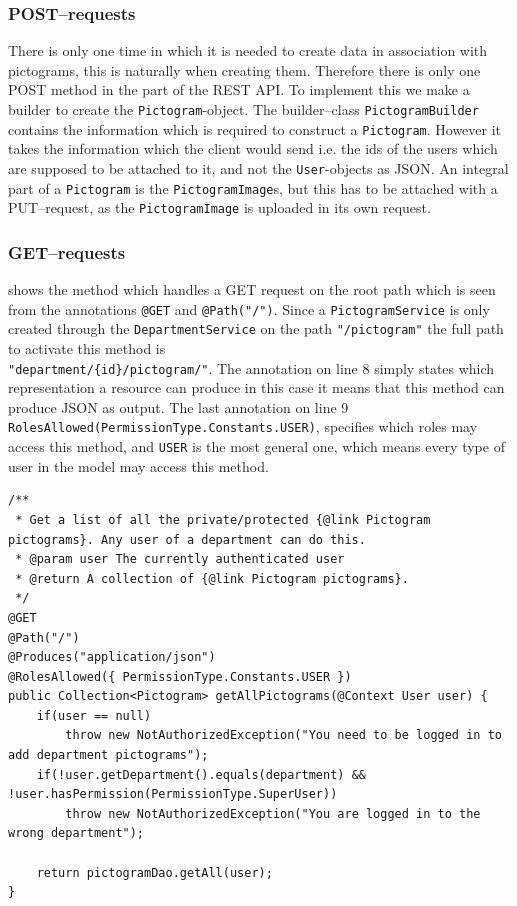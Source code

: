 \subsubsection*{POST--requests}
There is only one time in which it is needed to create data in association with pictograms, this is naturally when creating them.
Therefore there is only one POST method in the part of the REST API.
To implement this we make a builder to create the \texttt{Pictogram}-object.
The builder--class \texttt{PictogramBuilder} contains the information which is required to construct a \texttt{Pictogram}.
However it takes the information which the client would send i.e. the ids of the users which are supposed to be attached to it, and not the \texttt{User}-objects as JSON.
An integral part of a \texttt{Pictogram} is the \texttt{PictogramImage}s, but this has to be attached with a PUT--request, as the \texttt{PictogramImage} is uploaded in its own request. 

\subsubsection*{GET--requests}

 shows the method which handles a GET request on the root path which is seen from the annotations \texttt{@GET} and \texttt{@Path("/")}.
Since a \texttt{PictogramService} is only created through the \texttt{DepartmentService} on the path \texttt{"/pictogram"} the full path to activate this method is \\ \texttt{"department/\{id\}/pictogram/"}.
The annotation on line 8 simply states which representation a resource can produce in this case it means that this method can produce JSON as output.
The last annotation on line 9 \texttt{RolesAllowed({PermissionType.Constants.USER})}, specifies which roles may access this method, and \texttt{USER} is the most general one, which means every type of user in the model may access this method.

\begin{lstlisting}[float, floatplacement=h, caption={A GET request to get all pictograms for a department.},label={lst:getallPictograms}]
/**
 * Get a list of all the private/protected {@link Pictogram pictograms}. Any user of a department can do this.
 * @param user The currently authenticated user
 * @return A collection of {@link Pictogram pictograms}.
 */
@GET
@Path("/")
@Produces("application/json")
@RolesAllowed({ PermissionType.Constants.USER })
public Collection<Pictogram> getAllPictograms(@Context User user) {
    if(user == null)
        throw new NotAuthorizedException("You need to be logged in to add department pictograms");
    if(!user.getDepartment().equals(department) && !user.hasPermission(PermissionType.SuperUser))
        throw new NotAuthorizedException("You are logged in to the wrong department");

    return pictogramDao.getAll(user);
}
\end{lstlisting}

